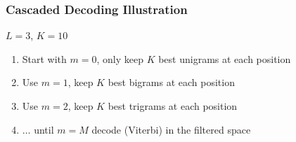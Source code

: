 \documentclass{beamer}
\begin{document}
\begin{frame}
\frametitle{Cascaded Decoding Illustration}
$L=3$, $K=10$

\begin{enumerate}
    \item<only@1> Start with $m=0$, only keep $K$ best unigrams at each position
    \item<only@2> Use $m=1$, keep $K$ best bigrams at each position
    \item<only@3> Use $m=2$, keep $K$ best trigrams at each position
    \item<only@4> $\ldots$ until $m=M$ decode (Viterbi) in the filtered space
\end{enumerate}
\begin{center}
\begin{overlayarea}{\textwidth}{10cm}

\end{overlayarea}
\end{center}
\end{frame}
\end{document}
